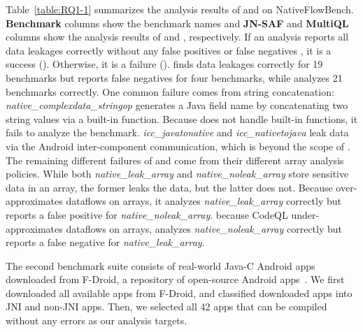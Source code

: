 Table~\ref{table:RQ1-1} summarizes the analysis
results of \jnsaf and \ours on NativeFlowBench.
{\bf Benchmark} columns show the benchmark names
and {\bf JN-SAF} and {\bf MultiQL} columns show 
the analysis results of \jnsaf and \ours, respectively.
If an analysis reports all data leakages correctly without any
false positives  or false negatives , it is a success (\cmark).
Otherwise, it is a failure (\xmark).
\ours finds data leakages correctly for 19 benchmarks but reports false
negatives for four benchmarks, while \jnsaf analyzes 21 benchmarks correctly. 
One common failure comes from string concatenation:
{\it native\_complexdata\_stringop} generates a Java field name by
concatenating two string values via a built-in function.
Because \ours does not handle built-in functions, it fails to analyze the benchmark.
{\it icc\_javatonative} and {\it icc\_nativetojava} leak data via the Android
inter-component communication, which is beyond the scope of \ours.
The remaining different failures of \ours and \jnsaf come from
their different array analysis policies.
While both {\it native\_leak\_array} and {\it native\_noleak\_array} store sensitive data in an array,
the former leaks the data, but the latter does not.
Because \jnsaf over-approximates dataflows on arrays,
it analyzes {\it native\_leak\_array} correctly but reports a false positive for {\it native\_noleak\_array}.
 because CodeQL under-approximates dataflows on arrays,
\ours analyzes {\it native\_noleak\_array} correctly but reports a false negative for
{\it native\_leak\_array}.


The second benchmark suite consists of real-world Java-C Android apps downloaded from
F-Droid, a repository of open-source Android apps~\cite{fdroid}.  We first
downloaded all available apps from F-Droid, and classified downloaded apps into JNI and non-JNI apps.
Then, we selected all 42 apps that can be compiled without any errors as our analysis targets.

